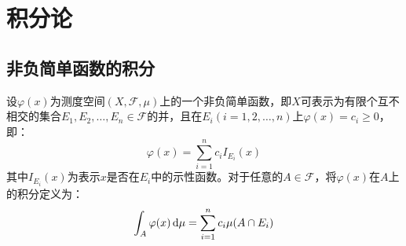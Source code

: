 \section{积分论}

\subsection{非负简单函数的积分}
\begin{definition}
	设$\varphi(x)$为测度空间$(X,\mathscr{F},\mu)$上的一个非负简单函数，即$X$可表示为有限个互不相交的集合$E_1,E_2,\dots,E_n\in \mathscr{F}$的并，且在$E_i(i=1,2,\dots,n)$上$\varphi(x)=c_i\geqslant0$，即：
	\begin{equation*}
		\varphi(x)=\sum_{i=1}^{n}c_iI_{E_i}(x)
	\end{equation*}
	其中$I_{E_i}(x)$为表示$x$是否在$E_i$中的示性函数。对于任意的$A\in \mathscr{F}$，将$\varphi(x)$在$A$上的积分定义为：
	\begin{equation*}
		\int_{A}\varphi(x)\mathop{}\!\mathrm{d}\mu=\sum_{i=1}^{n}c_i\mu(A\cap E_i)
	\end{equation*}
\end{definition}
